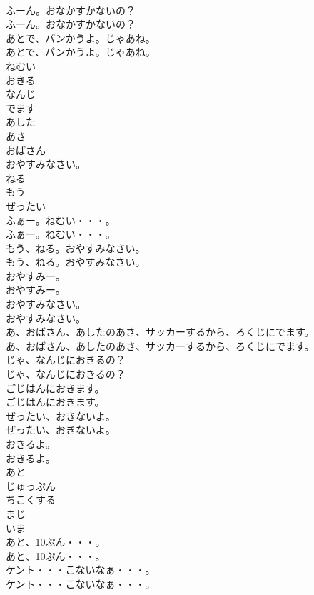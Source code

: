 \documentclass[8pt]{extreport}
\begin{document}
\begin{CJK}{UTF8}{min}
\\	ふーん。おなかすかないの？	
\\	ふーん。おなかすかないの？ 
\\	あとで、パンかうよ。じゃあね。	
\\	あとで、パンかうよ。じゃあね。 
\\	ねむい
\\	おきる
\\	なんじ
\\	でます
\\	あした
\\	あさ
\\	おばさん
\\	おやすみなさい。
\\	ねる
\\	もう
\\	ぜったい
\\	ふぁー。ねむい・・・。	
\\	ふぁー。ねむい・・・。 
\\	もう、ねる。おやすみなさい。	
\\	もう、ねる。おやすみなさい。 
\\	おやすみー。	
\\	おやすみー。 
\\	おやすみなさい。	
\\	おやすみなさい。 
\\	あ、おばさん、あしたのあさ、サッカーするから、ろくじにでます。	
\\	あ、おばさん、あしたのあさ、サッカーするから、ろくじにでます。 
\\	じゃ、なんじにおきるの？	
\\	じゃ、なんじにおきるの？ 
\\	ごじはんにおきます。	
\\	ごじはんにおきます。 
\\	ぜったい、おきないよ。	
\\	ぜったい、おきないよ。 
\\	おきるよ。	
\\	おきるよ。 
\\	あと
\\	じゅっぷん
\\	ちこくする
\\	まじ
\\	いま
\\	あと、10ぷん・・・。	
\\	あと、10ぷん・・・。 
\\	ケント・・・こないなぁ・・・。	
\\	ケント・・・こないなぁ・・・。 

\end{CJK}
\end{document}

